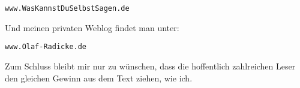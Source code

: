 \begin{center}
\texttt{www.WasKannstDuSelbstSagen.de}
\end{center}

Und meinen privaten Weblog findet man unter:

\begin{center}
\texttt{www.Olaf-Radicke.de}
\end{center}

Zum Schluss bleibt mir nur zu wünschen, dass die hoffentlich zahlreichen Leser
den gleichen Gewinn aus dem Text ziehen, wie ich.



